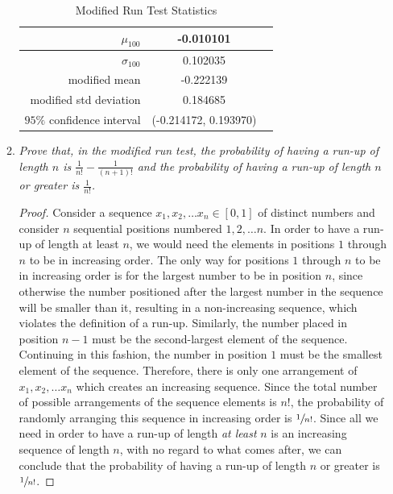 \documentclass{article}
\begin{document}
\begin{enumerate}
\begin{enumerate}
                \begin{table}[H]
                    \centering
                    \caption{Modified Run Test Statistics}
                    \begin{tabular}{|r|c|c|} \hline
                        \multicolumn{1}{|r|}{$\mu_{100}$}                   & \multicolumn{1}{|c|}{-0.010101}   \\ \hline
                        \multicolumn{1}{|r|}{$\sigma_{100}$}                & \multicolumn{1}{|c|}{0.102035}    \\ \hline
                        \multicolumn{1}{|r|}{modified mean}                 & \multicolumn{1}{|c|}{-0.222139}   \\ \hline
                        \multicolumn{1}{|r|}{modified std deviation}        & \multicolumn{1}{|c|}{0.184685}    \\ \hline
                        \multicolumn{1}{|r|}{$95\%$ confidence interval}    & \multicolumn{1}{|c|}{(-0.214172, 0.193970)}    \\ \hline
                    \end{tabular}
                    \label{tab:run-mod}
                \end{table}

            \item
                {\it Prove that, in the modified run test, the probability of having a run-up of length $n$ is $\frac{1}{n!} - \frac{1}{(n+1)!}$
                and the probability of having a run-up of length $n$ or greater is $\frac{1}{n!}$.}
                \begin{proof}
                    Consider a sequence $x_1, x_2, \dots x_n \in [0, 1]$ of distinct numbers and consider $n$ sequential positions numbered $1, 2, \dots n$.
                    In order to have a run-up of length at least $n$, we would need the elements in positions $1$ through $n$ to be in increasing order.
                    The only way for positions $1$ through $n$ to be in increasing order is for the largest number to be in position $n$,
                    since otherwise the number positioned after the largest number in the sequence will be smaller than it, resulting in a non-increasing sequence,
                    which violates the definition of a run-up.
                    Similarly, the number placed in position $n-1$ must be the second-largest element of the sequence.
                    Continuing in this fashion, the number in position $1$ must be the smallest element of the sequence.
                    Therefore, there is only one arrangement of $x_1, x_2, \dots x_n$ which creates an increasing sequence.
                    Since the total number of possible arrangements of the sequence elements is $n!$,
                    the probability of randomly arranging this sequence in increasing order is $\sfrac{1}{n!}$.
                    Since all we need in order to have a run-up of length {\it at least} $n$ is an increasing sequence of length $n$, with no regard to what comes after,
                    we can conclude that the probability of having a run-up of length $n$ or greater is $\sfrac{1}{n!}$.


\end{proof}
\end{enumerate}
\end{enumerate}
\end{document}
